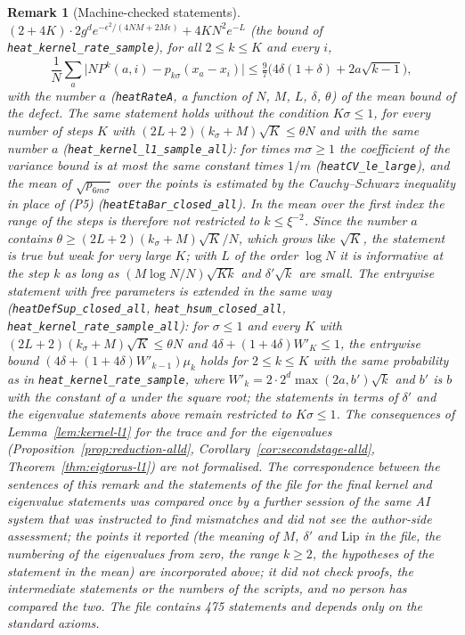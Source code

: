 \documentclass[11pt,a4paper]{article}
\theoremstyle{stmt}
\theoremstyle{defn}
\theoremstyle{rmk}
\newtheorem{remark}[theorem]{Remark}
\numberwithin{equation}{section}
\begin{document}
{\begin{remark}[Machine-checked statements]
$(2+4K)\cdot2g^de^{-\epsilon^2/(4NM+2M\epsilon)}+4KN^2e^{-L}$ (the bound of \texttt{heat\_kernel\_rate\_sample}), for all $2\le k\le K$ and every $i$,
\[\frac1N\sum_a\bigl|N P^{k}(a,i)-p_{k\sigma}(x_a-x_i)\bigr|\le\tfrac97\bigl(4\delta(1+\delta)+2a\sqrt{k-1}\bigr),\]
with the number $a$ (\texttt{heatRateA}, a function of $N$, $M$, $L$, $\delta$, $\theta$) of the mean bound of the defect. The same statement holds without the condition $K\sigma\le1$, for every number of steps $K$ with $(2L+2)(k_\sigma+M)\sqrt K\le\theta N$ and with the same number $a$ (\texttt{heat\_kernel\_l1\_sample\_all}): for times $m\sigma\ge1$ the coefficient of the variance bound is at most the same constant times $1/m$ (\texttt{heatCV\_le\_large}), and the mean of $\sqrt{p_{6m\sigma}}$ over the points is estimated by the Cauchy--Schwarz inequality in place of (P5) (\texttt{heatEtaBar\_closed\_all}). In the mean over the first index the range of the steps is therefore not restricted to $k\le\xi^{-2}$. Since the number $a$ contains $\theta\ge(2L+2)(k_\sigma+M)\sqrt K/N$, which grows like $\sqrt K$, the statement is true but weak for very large $K$; with $L$ of the order $\log N$ it is informative at the step $k$ as long as $(M\log N/N)\sqrt{Kk}$ and $\delta'\sqrt k$ are small. The entrywise statement with free parameters is extended in the same way (\texttt{heatDefSup\_closed\_all}, \texttt{heat\_hsum\_closed\_all}, \texttt{heat\_kernel\_rate\_sample\_all}): for $\sigma\le1$ and every $K$ with $(2L+2)(k_\sigma+M)\sqrt K\le\theta N$ and $4\delta+(1+4\delta)W'_K\le1$, the entrywise bound $(4\delta+(1+4\delta)W'_{k-1})\mu_k$ holds for $2\le k\le K$ with the same probability as in \texttt{heat\_kernel\_rate\_sample}, where $W'_k=2\cdot2^d\max(2a,b')\sqrt k$ and $b'$ is $b$ with the constant of $a$ under the square root; the statements in terms of $\delta'$ and the eigenvalue statements above remain restricted to $K\sigma\le1$. The consequences of Lemma~\ref{lem:kernel-l1} for the trace and for the eigenvalues (Proposition~\ref{prop:reduction-alld}, Corollary~\ref{cor:secondstage-alld}, Theorem~\ref{thm:eigtorus-l1}) are not formalised. The correspondence between the sentences of this remark and the statements of the file for the final kernel and eigenvalue statements was compared once by a further session of the same AI system that was instructed to find mismatches and did not see the author-side assessment; the points it reported (the meaning of $M$, $\delta'$ and $\mathrm{Lip}$ in the file, the numbering of the eigenvalues from zero, the range $k\ge2$, the hypotheses of the statement in the mean) are incorporated above; it did not check proofs, the intermediate statements or the numbers of the scripts, and no person has compared the two. The file contains 475 statements and depends only on the standard axioms.


\end{remark}}
\end{document}
